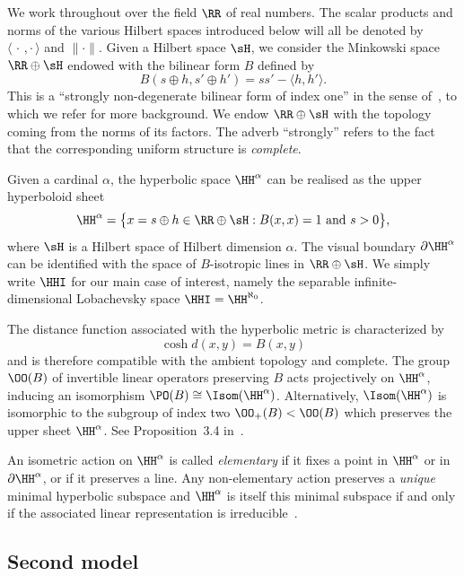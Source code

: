 We work throughout over the field $\RR$ of real numbers. The scalar products and norms of the various Hilbert spaces introduced below will all be denoted by ${\langle{\,\cdot\,, \cdot\,}\rangle}$ and ${\|\cdot\|}$. Given a Hilbert space $\sH$, we consider the Minkowski space $\RR\oplus \sH$ endowed with the bilinear form $B$ defined by
\[
B(s\oplus h, s'\oplus h') = s s' - \langle h,h'\rangle.
\]
This is a ``strongly non-degenerate bilinear form of index one'' in the sense of~\cite{Burger-Iozzi-Monod}, to which we refer for more background. We endow $\RR\oplus \sH$ with the topology coming from the norms of its factors. The adverb ``strongly'' refers to the fact that the corresponding uniform structure is \emph{complete}.

Given a cardinal $\alpha$, the hyperbolic space $\HH^\alpha$ can be realised as the upper hyperboloid sheet
\[
\HH^\alpha=\big\{x=s\oplus h \in \RR\oplus \sH : B(x,x) = 1 \text{ and } s > 0\big\},
\]
where $\sH$ is a Hilbert space of Hilbert dimension $\alpha$. The visual boundary $\partial\HH^\alpha$ can be identified with the space of $B$-isotropic lines in $\RR\oplus \sH$. We simply write $\HHI$ for our main case of interest, namely the separable infinite-dimensional Lobachevsky space $\HHI=\HH^{\aleph_0}$.

The distance function associated with the hyperbolic metric is characterized by
\[
\cosh d(x,y) = B(x,y)
\]
and is therefore compatible with the ambient topology and complete. The group $\OO(B)$ of invertible linear operators preserving $B$ acts projectively on $\HH^\alpha$, inducing an isomorphism $\PO(B)\cong\Isom(\HH^\alpha)$. Alternatively, $\Isom(\HH^\alpha)$ is isomorphic to the subgroup of index two $\OO_+(B)<\OO(B)$ which preserves the upper sheet $\HH^\alpha$. See Proposition~3.4 in~\cite{Burger-Iozzi-Monod}.

An isometric action on $\HH^\alpha$ is called \emph{elementary} if it fixes a point in $\HH^\alpha$ or in $\partial\HH^\alpha$, or if it preserves a line. Any non-elementary action preserves a \emph{unique} minimal hyperbolic subspace and $\HH^\alpha$ is itself this minimal subspace if and only if the associated linear representation is irreducible~\cite[\S4]{Burger-Iozzi-Monod}.


\subsection{Second model}\label{sec:model}

